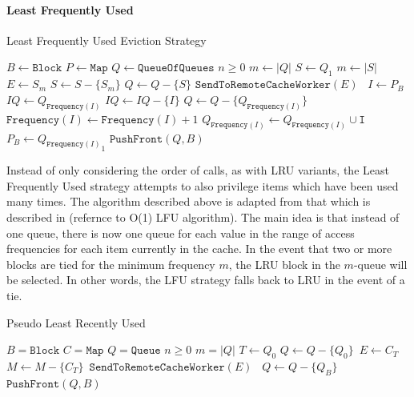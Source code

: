 \paragraph{Least Frequently Used}
\begin{algorithm}
    \caption{Least Frequently Used Eviction Strategy}
    \begin{algorithmic}[1]
        \State $B \gets \texttt{Block}$
        \State $P \gets \texttt{Map}$
        \State $Q \gets \texttt{QueueOfQueues}$ 
        \State $n \ge 0$
        \State $m \gets |Q|$
                \State $S \gets Q_1$
                \State $m \gets |S|$
                \State $E \gets S_m$
                \State $S \gets S - \{S_m\}$
                    \State $Q \gets Q - \{S\}$
                \EndIf
                \State $\texttt{SendToRemoteCacheWorker}(E)$\
            \EndIf
        \Else
            \State $I \gets P_B$
            \State $IQ \gets Q_{\texttt{Frequency}(I)}$
            \State $IQ \gets IQ - \{I\}$
                \State $Q \gets Q - \{Q_{\texttt{Frequency}(I)}\}$
            \EndIf
            \State $\texttt{Frequency}(I) \gets \texttt{Frequency}(I) + 1$
            \State $Q_{\texttt{Frequency}(I)} \gets Q_{\texttt{Frequency}(I)} \cup \texttt{I}$
            \State $P_B \gets {Q_{\texttt{Frequency}(I)}}_1$
        \EndIf
        \State $\texttt{PushFront}(Q, B)$
    \end{algorithmic}
\end{algorithm}
Instead of only considering the order of calls, as with LRU variants, the Least Frequently Used strategy attempts to also privilege items which have been used many times. The algorithm described above is adapted from that which is described in (refernce to O(1) LFU algorithm). The main idea is that instead of one queue, there is now one queue for each value in the range of access frequencies for each item currently in the cache. In the event that two or more blocks are tied for the minimum frequency $m$, the LRU block in the $m$-queue will be selected. In other words, the LFU strategy falls back to LRU in the event of a tie. 


\begin{algorithm}
    \caption{Pseudo Least Recently Used}
    \begin{algorithmic}[1]
        \State $B = \texttt{Block}$
        \State $C = \texttt{Map}$
        \State $Q = \texttt{Queue}$
        \State $n \ge 0$
        \State $m = |Q|$
                \State $T \gets Q_0$
                \State $Q \gets Q - \{Q_0\}$\
                \State $E \gets C_T$\
                \State $M \gets M - \{C_T\}$\
                \State $\texttt{SendToRemoteCacheWorker}(E)$\
            \EndIf
        \Else
            \State $Q \gets Q - \{Q_B\}$
        \EndIf
        \State $\texttt{PushFront}(Q, B)$
    \end{algorithmic}
\end{algorithm}
